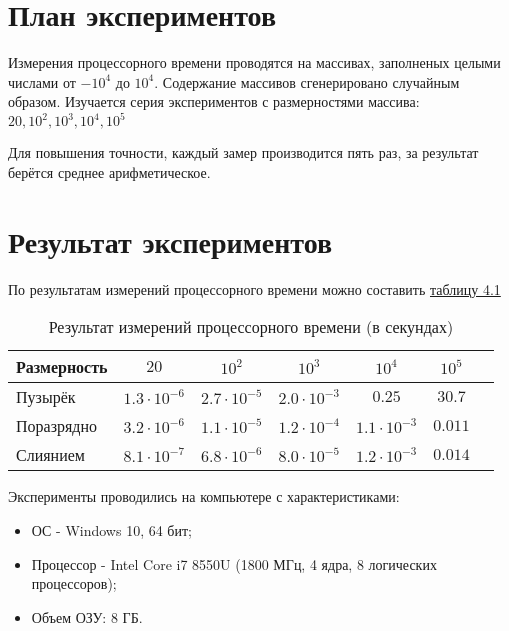 \section{План экспериментов}
Измерения процессорного времени проводятся на массивах, заполненых целыми числами от $ -10^{4} $ до $ 10^{4} $. Содержание массивов сгенерировано случайным образом. Изучается серия экспериментов с размерностями массива: $20, 10^{2}, 10^{3}, 10^{4}, 10^{5}$

Для повышения точности, каждый замер производится пять раз, за результат берётся среднее арифметическое.

\section{Результат экспериментов}
По результатам измерений процессорного времени можно составить \hyperref[table_4_1]{таблицу 4.1}

\begin{table}[h] \label{table_4_1}
\caption{Результат измерений процессорного времени (в секундах)}
\begin{tabular}{| p{3.0cm} | c | c | c | c | c | c |}
	\hline
	Размерность		&$20$				&$10^{2}$			&$10^{3}$			&$10^{4}$			&$10^{5}$\\
	\hline\hline
	Пузырёк			&$1.3\cdot10^{-6}$	&$2.7\cdot10^{-5}$	&$2.0\cdot10^{-3}$	&$0.25$				&$30.7$	\\
	\hline
	Поразрядно		&$3.2\cdot10^{-6}$	&$1.1\cdot10^{-5}$	&$1.2\cdot10^{-4}$	&$1.1\cdot10^{-3}$	&$0.011$\\
	\hline
	Слиянием		&$8.1\cdot10^{-7}$	&$6.8\cdot10^{-6}$	&$8.0\cdot10^{-5}$	&$1.2\cdot10^{-3}$	&$0.014$\\
	\hline
\end{tabular}
\end{table}


Эксперименты проводились на компьютере с характеристиками:
\begin{itemize}
	\item ОС - Windows 10, 64 бит;
	\item Процессор -  Intel Core i7 8550U (1800 МГц, 4 ядра, 8 логических процессоров);
	\item Объем ОЗУ: 8 ГБ.
\end{itemize}

